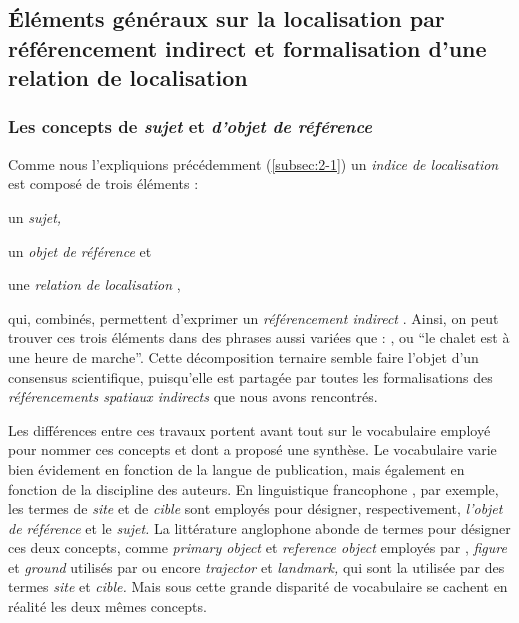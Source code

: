 
\subsection{Éléments généraux sur la localisation par référencement
  indirect et formalisation d'une relation de localisation}

\subsubsection{Les concepts de \emph{sujet} et \emph{d'objet de
    référence}}

Comme nous l'expliquions précédemment (\autoref{subsec:2-1}) un
\emph{indice de localisation} est composé de trois éléments :
%
\begin{enumerate*}[label=(\alph*)]
\item \label{i:site} un \emph{sujet,}
\item \label{i:cible} un \emph{objet de référence} et
\item une \emph{relation de localisation} \autocite{??},
\end{enumerate*}
%
qui, combinés, permettent d'exprimer un \emph{référencement indirect}
\autocite{??}. Ainsi, on peut trouver ces trois éléments dans des
phrases aussi variées que :
,  ou \enquote{le chalet est à une heure de
  marche}. Cette décomposition ternaire semble faire l'objet d'un
consensus scientifique, puisqu'elle est partagée par toutes les
formalisations des \emph{référencements spatiaux indirects} que nous
avons rencontrés.

Les différences entre ces travaux portent avant tout sur le
vocabulaire employé pour nommer ces concepts et dont
\textcite{RetzSchmidt1988} a proposé une synthèse. Le vocabulaire
varie bien évidement en fonction de la langue de publication, mais
également en fonction de la discipline des auteurs. En linguistique
francophone \autocite{Vandeloise1986,Borillo1998, Aurnague1997,
  Mathet2000}, par exemple, les termes de \emph{site} et de
\emph{cible} sont employés pour désigner, respectivement,
\emph{l'objet de référence} et le \emph{sujet.}
%
La littérature anglophone abonde de termes pour désigner ces deux
concepts, comme \emph{primary object} et \emph{reference object}
employés par \textcite{RetzSchmidt1988, Clementini2013}, \emph{figure}
et \emph{ground} utilisés par \textcite{Talmy1983} ou encore
\emph{trajector} et \emph{landmark,} qui sont la utilisée par
\textcite{Vandeloise1984} des termes \emph{site} et \emph{cible.}
%
Mais sous cette grande disparité de vocabulaire se cachent en réalité
les deux mêmes concepts.

